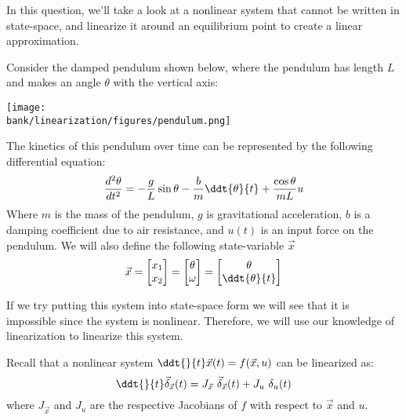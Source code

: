 
In this question, we'll take a look at a nonlinear system that cannot be written in state-space, and linearize it around an equilibrium point to create a linear approximation.

Consider the damped pendulum shown below, where the pendulum has length $L$ and makes an angle $\theta$ with the vertical axis:
\begin{center}
\texttt{[image: \\bank/linearization/figures/pendulum.png]}
\end{center}
The kinetics of this pendulum over time can be represented by the following differential equation:
\begin{equation}
  \frac{d^{2} \theta}{dt^{2}} = -\frac{g}{L} \sin \theta - \frac{b}{m} \ddt{\theta}{t} + \frac{\cos \theta}{mL} u
\end{equation}
Where $m$ is the mass of the pendulum, $g$ is gravitational acceleration, $b$ is a damping coefficient due to air resistance, and $u(t)$ is an input force on the pendulum. We will also define the following state-variable $\vec{x}$ 
\begin{equation*}
  \vec{x} = \begin{bmatrix} x_{1} \\ x_{2} \end{bmatrix} = \begin{bmatrix} \theta \\ \omega \end{bmatrix} = \begin{bmatrix} \theta \\ \ddt{\theta}{t} \end{bmatrix}
\end{equation*}

If we try putting this system into state-space form we will see that it is impossible since the system is nonlinear.
Therefore, we will use our knowledge of linearization to linearize this system.

Recall that a nonlinear system $\ddt{}{t} \vec{x}(t) = f(\vec{x}, u)$ can be linearized as:
\begin{equation}
  \ddt{}{t} \vec{\delta}_{\vec{x}}(t) = J_{\vec{x}} \ \vec{\delta}_{\vec{x}}(t) + J_{u} \ \delta_{u}(t)
\end{equation}
where $J_{\vec{x}}$ and $J_{u}$ are the respective Jacobians of $f$ with respect to $\vec{x}$ and $u.$

